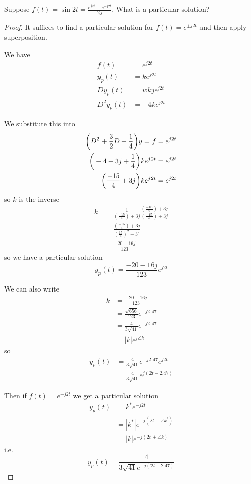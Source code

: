 \documentclass[12pt]{article}
\begin{document}
\begin{example}
Suppose $f(t) = \sin 2t = \frac{e^{j2t} - e^{-j2t}}{2j}$. What is a particular solution?

\begin{proof}
It suffices to find a particular solution for $f(t) = e^{\pm j2t}$ and then apply superposition.

We have
\begin{align*}
f(t) &= e^{j2t}\\
y_p(t) &= ke^{j2t}\\
Dy_p(t) &= wkje^{j2t}\\
D^2y_p(t) &= -4ke^{j2t}
\end{align*}

We substitute this into
\begin{align*}
\bigg(D^2 + \frac{3}{2}D + \frac{1}{4}\bigg) y = f &= e^{j2t}\\
\bigg(-4 + 3j + \frac{1}{4}\bigg) ke^{j2t} &= e^{j2t}\\
\bigg(\frac{-15}{4} + 3j\bigg) ke^{j2t} &= e^{j2t}
\end{align*}
so $k$ is the inverse
\begin{align*}
k &= \frac{1}{(\frac{-15}{4}) + 3j} \frac{(\frac{-15}{4}) + 3j}{(\frac{-15}{4}) + 3j}\\
&= \frac{(\frac{-15}{4}) + 3j}{{(\frac{15}{4})}^2 + 3^2}\\
&= \frac{-20 -16j}{123}
\end{align*}
so we have a particular solution \[ y_p(t) = \frac{-20-16j}{123}e^{j2t} \]

We can also write
\begin{align*}
k &= \frac{-20 - 16j}{123}\\
&= \frac{\sqrt{656}}{123} e^{-j2.47}\\
&= \frac{4}{3\sqrt{41}} e^{-j2.47}\\
&= |k|e^{j\angle k}
\end{align*}
so
\begin{align*}
y_p(t) &= \frac{4}{3\sqrt{41}} e^{-j2.47}e^{j2t}\\
&= \frac{4}{3\sqrt{41}} e^{j(2t-2.47)}
\end{align*}

Then if $f(t) = e^{-j2t}$ we get a particular solution
\begin{align*}
y_p(t) &= k^* e^{-j2t}\\
&= |k^*| e^{-j(2t-\angle k^*)}\\
&= |k| e^{-j(2t+\angle k)}
\end{align*}
i.e.\ \[ y_p(t) = \frac{4}{3\sqrt{41} e^{-j(2t - 2.47)}} \]


\end{proof}
\end{example}
\end{document}
